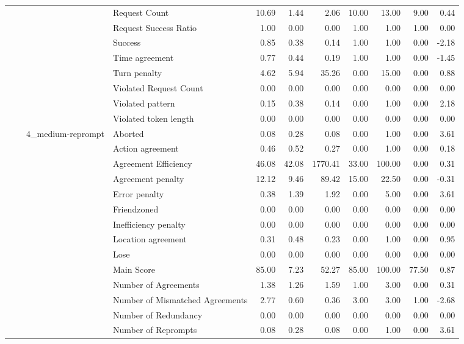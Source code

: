 \begin{tabular}{llllrrrrrrr}
 &  &  & Request Count & 10.69 & 1.44 & 2.06 & 10.00 & 13.00 & 9.00 & 0.44 \\
 &  &  & Request Success Ratio & 1.00 & 0.00 & 0.00 & 1.00 & 1.00 & 1.00 & 0.00 \\
 &  &  & Success & 0.85 & 0.38 & 0.14 & 1.00 & 1.00 & 0.00 & -2.18 \\
 &  &  & Time agreement & 0.77 & 0.44 & 0.19 & 1.00 & 1.00 & 0.00 & -1.45 \\
 &  &  & Turn penalty & 4.62 & 5.94 & 35.26 & 0.00 & 15.00 & 0.00 & 0.88 \\
 &  &  & Violated Request Count & 0.00 & 0.00 & 0.00 & 0.00 & 0.00 & 0.00 & 0.00 \\
 &  &  & Violated pattern & 0.15 & 0.38 & 0.14 & 0.00 & 1.00 & 0.00 & 2.18 \\
 &  &  & Violated token length & 0.00 & 0.00 & 0.00 & 0.00 & 0.00 & 0.00 & 0.00 \\
\cline{3-11}
 &  & \multirow[t]{27}{*}{4_medium-reprompt} & Aborted & 0.08 & 0.28 & 0.08 & 0.00 & 1.00 & 0.00 & 3.61 \\
 &  &  & Action agreement & 0.46 & 0.52 & 0.27 & 0.00 & 1.00 & 0.00 & 0.18 \\
 &  &  & Agreement Efficiency & 46.08 & 42.08 & 1770.41 & 33.00 & 100.00 & 0.00 & 0.31 \\
 &  &  & Agreement penalty & 12.12 & 9.46 & 89.42 & 15.00 & 22.50 & 0.00 & -0.31 \\
 &  &  & Error penalty & 0.38 & 1.39 & 1.92 & 0.00 & 5.00 & 0.00 & 3.61 \\
 &  &  & Friendzoned & 0.00 & 0.00 & 0.00 & 0.00 & 0.00 & 0.00 & 0.00 \\
 &  &  & Inefficiency penalty & 0.00 & 0.00 & 0.00 & 0.00 & 0.00 & 0.00 & 0.00 \\
 &  &  & Location agreement & 0.31 & 0.48 & 0.23 & 0.00 & 1.00 & 0.00 & 0.95 \\
 &  &  & Lose & 0.00 & 0.00 & 0.00 & 0.00 & 0.00 & 0.00 & 0.00 \\
 &  &  & Main Score & 85.00 & 7.23 & 52.27 & 85.00 & 100.00 & 77.50 & 0.87 \\
 &  &  & Number of Agreements & 1.38 & 1.26 & 1.59 & 1.00 & 3.00 & 0.00 & 0.31 \\
 &  &  & Number of Mismatched Agreements & 2.77 & 0.60 & 0.36 & 3.00 & 3.00 & 1.00 & -2.68 \\
 &  &  & Number of Redundancy & 0.00 & 0.00 & 0.00 & 0.00 & 0.00 & 0.00 & 0.00 \\
 &  &  & Number of Reprompts & 0.08 & 0.28 & 0.08 & 0.00 & 1.00 & 0.00 & 3.61 \\

\end{tabular}
